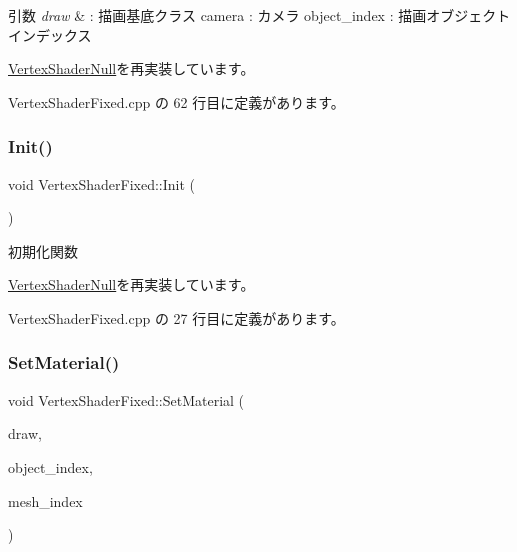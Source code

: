 \begin{DoxyParams}{引数}
{\em draw} & \+: 描画基底クラス camera \+: カメラ object\+\_\+index \+: 描画オブジェクトインデックス \\
\hline
\end{DoxyParams}


\mbox{\hyperlink{class_vertex_shader_null_a95f1a66045fb39c42cf0566f1990b6a1}{Vertex\+Shader\+Null}}を再実装しています。



 Vertex\+Shader\+Fixed.\+cpp の 62 行目に定義があります。

\mbox{\label{class_vertex_shader_fixed_ae829ff736b33c45543804059255125b6}} 
\subsubsection{\texorpdfstring{Init()}{Init()}}
{\footnotesize\ttfamily void Vertex\+Shader\+Fixed\+::\+Init (\begin{DoxyParamCaption}{ }\end{DoxyParamCaption})\hspace{0.3cm}{\ttfamily [virtual]}}



初期化関数 



\mbox{\hyperlink{class_vertex_shader_null_af30eb8057fe0537bc6ade214647b6fb5}{Vertex\+Shader\+Null}}を再実装しています。



 Vertex\+Shader\+Fixed.\+cpp の 27 行目に定義があります。

\mbox{\label{class_vertex_shader_fixed_a05ce5fdd8ff190b9934497f42cf19a38}} 
\subsubsection{\texorpdfstring{Set\+Material()}{SetMaterial()}}
{\footnotesize\ttfamily void Vertex\+Shader\+Fixed\+::\+Set\+Material (\begin{DoxyParamCaption}\item[{\mbox{\hyperlink{class_draw_base}{Draw\+Base}} $\ast$}]{draw,  }\item[{unsigned}]{object\+\_\+index,  }\item[{unsigned}]{mesh\+\_\+index }\end{DoxyParamCaption})\hspace{0.3cm}{\ttfamily [private]}}



